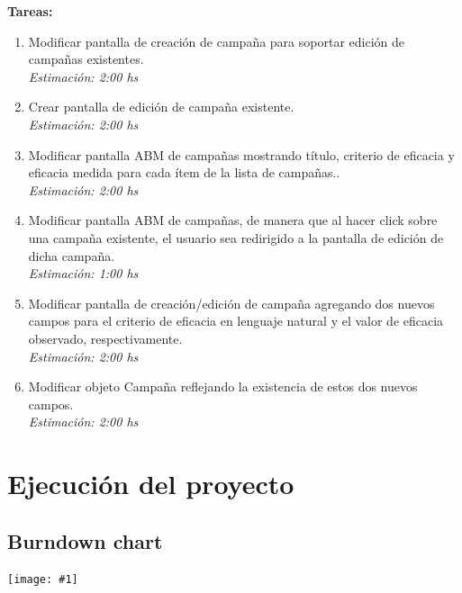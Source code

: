 \documentclass[a4paper, 10pt, twoside]{article}
\newcommand{\grafico}[1]{
  \begin{center}
    \texttt{[image: \#1]}
  \end{center}
}
\newenvironment{tasks}{
  \textbf{Tareas:}
  \begin{enumerate}
}{
  \end{enumerate}
}
\newcommand{\task}[2] {
  \item #1.\\
  \emph{Estimación: #2 hs}
}
\begin{document}
\begin{tasks}
  \task{Modificar pantalla de creación de campaña para soportar edición de campañas existentes}{2:00}
  \task{Crear pantalla de edición de campaña existente}{2:00}
  \task{Modificar pantalla ABM de campañas mostrando título, criterio de eficacia y eficacia medida para cada ítem de la lista de campañas.}{2:00}
  \task{Modificar pantalla ABM de campañas, de manera que al hacer click sobre una campaña existente, el usuario sea redirigido a la pantalla de edición de dicha campaña}{1:00}
  \task{Modificar pantalla de creación/edición de campaña agregando dos nuevos campos para el criterio de eficacia en lenguaje natural y el valor de eficacia observado, respectivamente}{2:00}
  \task{Modificar objeto Campaña reflejando la existencia de estos dos nuevos campos}{2:00}
\end{tasks}

\newpage
\section{Ejecución del proyecto}

\subsection{Burndown chart}
\grafico{diagramas/iteration_burndown.jpg}
\end{document}
